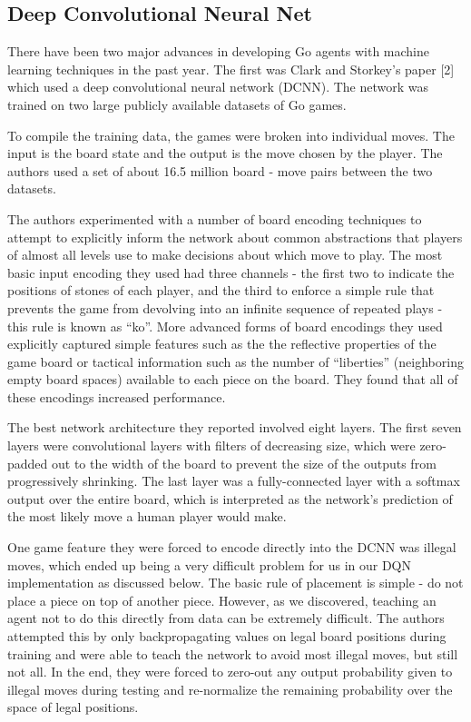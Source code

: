 \subsection*{Deep Convolutional Neural Net}
There have been two major advances in developing Go agents with machine learning techniques in the past year. The first was Clark and Storkey's paper [2] which used a deep convolutional neural network (DCNN). The network was trained on two large publicly available datasets of Go games.

To compile the training data, the games were broken into individual moves. The input is the board state and the output is the move chosen by the player. The authors used a set of about 16.5 million board - move pairs between the two datasets.

The authors experimented with a number of board encoding techniques to attempt to explicitly inform the network about common abstractions that players of almost all levels use to make decisions about which move to play. The most basic input encoding they used had three channels - the first two to indicate the positions of stones of each player, and the third to enforce a simple rule that prevents the game from devolving into an infinite sequence of repeated plays - this rule is known as ``ko''. More advanced forms of board encodings they used explicitly captured simple features such as the the reflective properties of the game board or tactical information such as the number of ``liberties'' (neighboring empty board spaces) available to each piece on the board. They found that all of these encodings increased performance.

The best network architecture they reported involved eight layers. The first seven layers were convolutional layers with filters of decreasing size, which were zero-padded out to the width of the board to prevent the size of the outputs from progressively shrinking. The last layer was a fully-connected layer with a softmax output over the entire board, which is interpreted as the network's prediction of the most likely move a human player would make.

One game feature they were forced to encode directly into the DCNN was illegal moves, which ended up being a very difficult problem for us in our DQN implementation as discussed below. The basic rule of placement is simple - do not place a piece on top of another piece. However, as we discovered, teaching an agent not to do this directly from data can be extremely difficult. The authors attempted this by only backpropagating values on legal board positions during training and were able to teach the network to avoid most illegal moves, but still not all. In the end, they were forced to zero-out any output probability given to illegal moves during testing and re-normalize the remaining probability over the space of legal positions.

